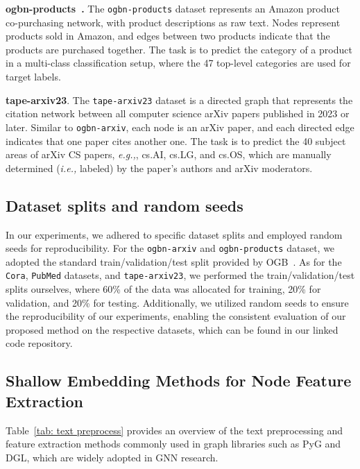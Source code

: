 \documentclass{article}
\newcommand{\ie}{\emph{i.e.,}\xspace}
\newcommand{\eg}{\emph{e.g.,}\xspace}
\begin{document}
\textbf{ogbn-products~\citep{hu2020open}.}
The \texttt{ogbn-products} dataset represents an Amazon product co-purchasing network, with product descriptions as raw text. Nodes represent products sold in Amazon, and edges between two products indicate that the products are purchased together. The task is to predict the category of a product in a multi-class classification setup, where the 47 top-level categories are used for target labels.

\textbf{tape-arxiv23}. 
The \texttt{tape-arxiv23} dataset is a directed graph that represents the citation network between all computer science arXiv papers published in 2023 or later. Similar to \texttt{ogbn-arxiv}, each node is an arXiv paper, and each directed edge indicates that one paper cites another one. The task is to predict the 40 subject areas of arXiv CS papers, \eg, cs.AI, cs.LG, and cs.OS, which are manually determined (\ie labeled) by the paper’s authors and arXiv moderators. 




\subsection{Dataset splits and random seeds}
In our experiments, we adhered to specific dataset splits and employed random seeds for reproducibility.
For the \texttt{ogbn-arxiv} and \texttt{ogbn-products} dataset, we adopted the standard train/validation/test split provided by OGB~\citep{hu2020open}.
As for the \texttt{Cora}, \texttt{PubMed} datasets, and \texttt{tape-arxiv23}, we performed the train/validation/test splits ourselves, where 60\% of the data was allocated for training, 20\% for validation, and 20\% for testing. Additionally, we utilized random seeds to ensure the reproducibility of our experiments, enabling the consistent evaluation of our proposed method on the respective datasets, which can be found in our linked code repository.


\subsection{Shallow Embedding Methods for Node Feature Extraction}

Table~\ref{tab: text preprocess} provides an overview of the text preprocessing and feature extraction methods commonly used in graph libraries such as PyG and DGL, which are widely adopted in GNN research.
\end{document}
